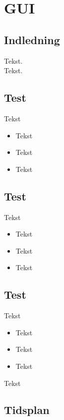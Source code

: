 \section{GUI}

\subsection{Indledning}

Tekst.\\

Tekst.\\




\subsection{Test}

Tekst
\begin{itemize}
	\item Tekst
	\item Tekst
	\item Tekst
\end{itemize}

\subsection{Test}

Tekst

\begin{itemize}
	\item Tekst
	\item Tekst
	\item Tekst

\end{itemize}


\subsection{Test}

Tekst

\begin{itemize}
	\item Tekst
	\item Tekst
	\item Tekst
\end{itemize}

Tekst


\subsection{Tidsplan}

